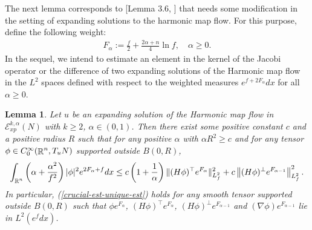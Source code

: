 \documentclass[a4paper,11pt,reqno]{amsart}
\newtheorem{lemma}[defn]{Lemma}
\def\R{\mathop{\rm \mathbb{R}}\nolimits}
\newcommand{\Ent}{\mathcal{E}}
\begin{document}
The next lemma corresponds to [Lemma $3.6$, \cite{Uni-Con-Egs-Der}] that needs some modification in the setting of expanding solutions to the harmonic map flow. For this purpose, define the following weight:
\begin{eqnarray*}
F_{\alpha}:=\frac{f}{2}+\frac{2\alpha+n}{4}\ln f,\quad \alpha \geq 0.
\end{eqnarray*}
In the sequel, we intend to estimate an element in the kernel of the Jacobi operator or the difference of two expanding solutions of the Harmonic map flow in the $L^2$ spaces defined with respect to the weighted measures $e^{f+2F_{\alpha}}dx$ for all $\alpha\geq 0$.
\begin{lemma}\label{lemma-carleman}
Let $u$ be an expanding solution of the Harmonic map flow in $\Ent_{xp}^{k,\alpha}(N)$ with $k\geq 2$, $\alpha\in(0,1)$.
Then there exist some positive constant $c$ and a positive radius $R$ such that for any positive $\alpha$ with $\alpha R^2\geq c$ and for any tensor $\phi\in C^{\infty}_0(\R^n,T_uN)$ supported outside $B(0,R)$,
\begin{eqnarray}
\int_{\R^n}\left(\alpha+\frac{\alpha^2}{f^2}\right)|\phi|^2e^{2F_{\alpha}+f}dx\leq c\left(1+\frac{1}{\alpha}\right)\|(H\phi)^{\top}e^{F_{\alpha}}\|^2_{L^2_f}+c\left\|(H\phi)^{\perp}e^{F_{\alpha-1}}\right\|_{L^2_f}^2.\label{crucial-est-unique-est}
\end{eqnarray}
In particular, (\ref{crucial-est-unique-est}) holds for any smooth tensor supported outside $B(0,R)$ such that $\phi e^{F_{\alpha}}$, $(H\phi)^{\top}e^{F_{\alpha}}$, $(H\phi)^{\perp}e^{F_{\alpha-1}}$ and $(\nabla \phi)e^{F_{\alpha-1}}$ lie in $L^2(e^fdx)$.
\end{lemma}
\end{document}

